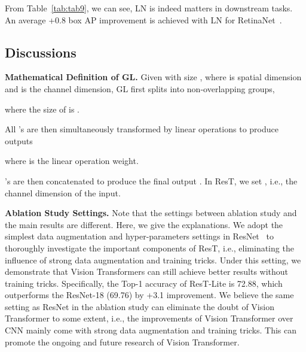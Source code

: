 \documentclass{article}
\begin{document}
From Table~\ref{tab:tab9}, we can see, LN is indeed matters in downstream tasks. An average +0.8 box AP improvement is achieved with LN for RetinaNet~\cite{DBLP:conf/iccv/LinGGHD17}.

\subsection{Discussions}
\textbf{Mathematical Definition of GL.}
Given  with size , where  is spatial dimension and  is the channel dimension, GL first splits  into  non-overlapping groups,


where the size of  is . 

All ’s are then simultaneously transformed by  linear operations to produce  outputs 

where  is the linear operation weight. 

’s are then concatenated to produce the final  output . In ResT, we set , i.e., the channel dimension of the input.

\textbf{Ablation Study Settings.}
Note that the settings between ablation study and the main results are different. Here, we give the explanations.
We adopt the simplest data augmentation and hyper-parameters settings in ResNet~\cite{DBLP:conf/cvpr/HeZRS16} to thoroughly investigate the important components of ResT, i.e., eliminating the influence of strong data augmentation and training tricks. Under this setting, we demonstrate that Vision Transformers can still achieve better results without training tricks. Specifically, the Top-1 accuracy of ResT-Lite is 72.88, which outperforms the ResNet-18 (69.76) by +3.1 improvement. We believe the same setting as ResNet in the ablation study can eliminate the doubt of Vision Transformer to some extent, i.e., the improvements of Vision Transformer over CNN mainly come with strong data augmentation and training tricks. This can promote the ongoing and future research of Vision Transformer.
\end{document}
